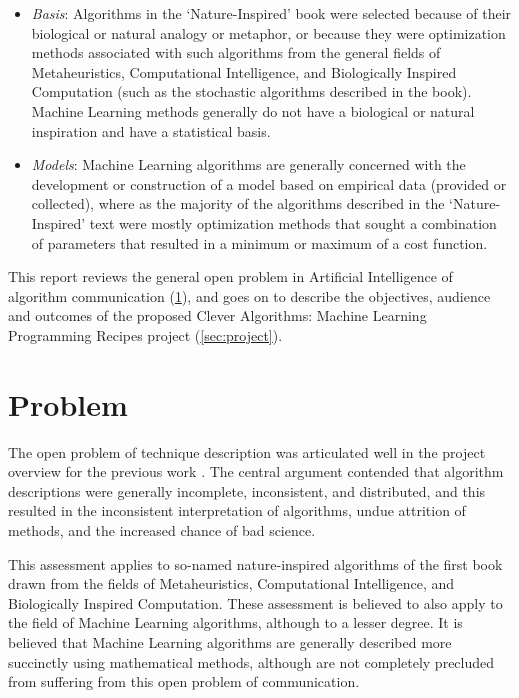 \documentclass[a4paper, 11pt]{article}
\begin{document}
\begin{itemize}
	\item \emph{Basis}: Algorithms in the `Nature-Inspired' book were selected because of their biological or natural analogy or metaphor, or because they were optimization methods associated with such algorithms from the general fields of Metaheuristics, Computational Intelligence, and Biologically Inspired Computation (such as the stochastic algorithms described in the book). Machine Learning methods generally do not have a biological or natural inspiration and have a statistical basis.
	\item \emph{Models}: Machine Learning algorithms are generally concerned with the development or construction of a model based on empirical data (provided or collected), where as the majority of the algorithms described in the `Nature-Inspired' text were mostly optimization methods that sought a combination of parameters that resulted in a minimum or maximum of a cost function.
\end{itemize}

This report reviews the general open problem in Artificial Intelligence of algorithm communication (\ref{sec:problem}), and goes on to describe the objectives, audience and outcomes of the proposed Clever Algorithms: Machine Learning Programming Recipes project (\ref{sec:project}).

\section{Problem}
\label{sec:problem}
The open problem of technique description was articulated well in the project overview for the previous work \cite{Brownlee2010}. The central argument contended that algorithm descriptions were generally incomplete, inconsistent, and distributed, and this resulted in the inconsistent interpretation of algorithms, undue attrition of methods, and the increased chance of bad science. 

This assessment applies to so-named nature-inspired algorithms of the first book drawn from the fields of Metaheuristics, Computational Intelligence, and Biologically Inspired Computation. These assessment is believed to also apply to the field of Machine Learning algorithms, although to a lesser degree. It is believed that Machine Learning algorithms are generally described more succinctly using mathematical methods, although are not completely precluded from suffering from this open problem of communication.
\end{document}

